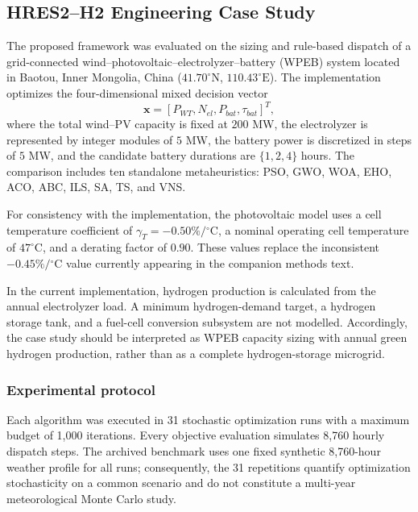 
\subsection{HRES2--H2 Engineering Case Study}
\label{sec:hres2_case_study_revision}

The proposed framework was evaluated on the sizing and rule-based dispatch of a
grid-connected wind--photovoltaic--electrolyzer--battery (WPEB) system located
in Baotou, Inner Mongolia, China ($41.70^\circ\mathrm{N}$,
$110.43^\circ\mathrm{E}$). The implementation optimizes the four-dimensional
mixed decision vector
\begin{equation}
    \mathbf{x} = [P_{WT}, N_{el}, P_{bat}, \tau_{bat}]^{T},
\end{equation}
where the total wind--PV capacity is fixed at $200$ MW, the electrolyzer is
represented by integer modules of $5$ MW, the battery power is discretized in
steps of $5$ MW, and the candidate battery durations are $\{1,2,4\}$ hours.
The comparison includes ten standalone metaheuristics: PSO, GWO, WOA, EHO,
ACO, ABC, ILS, SA, TS, and VNS.

For consistency with the implementation, the photovoltaic model uses a cell
temperature coefficient of $\gamma_T=-0.50\%/{}^\circ\mathrm{C}$, a nominal
operating cell temperature of $47^\circ\mathrm{C}$, and a derating factor of
$0.90$. These values replace the inconsistent $-0.45\%/{}^\circ\mathrm{C}$
value currently appearing in the companion methods text.

In the current implementation, hydrogen production is calculated from the
annual electrolyzer load. A minimum hydrogen-demand target, a hydrogen storage
tank, and a fuel-cell conversion subsystem are not modelled. Accordingly, the
case study should be interpreted as WPEB capacity sizing with annual green
hydrogen production, rather than as a complete hydrogen-storage microgrid.

\subsubsection{Experimental protocol}

Each algorithm was executed in 31 stochastic optimization runs with a maximum
budget of 1,000 iterations. Every objective evaluation simulates 8,760 hourly
dispatch steps. The archived benchmark uses one fixed synthetic 8,760-hour
weather profile for all runs; consequently, the 31 repetitions quantify
optimization stochasticity on a common scenario and do not constitute a
multi-year meteorological Monte Carlo study.


